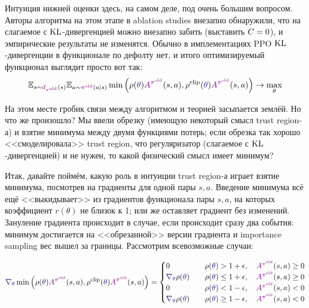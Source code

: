Интуиция нижней оценки здесь, на самом деле, под очень большим вопросом. Авторы алгоритма на этом этапе в ablation studies внезапно обнаружили, что на слагаемое с $\operatorname{KL}$-дивергенцией можно внезапно забить (выставить $C \HM= 0$), и эмпирические результаты не изменятся. Обычно в имплементациях PPO $\operatorname{KL}$-дивергенции в функционале по дефолту нет, и итого оптимизируемый функционал выглядит просто вот так:
\begin{equation}\label{PPOobjective}
\E_{s \sim \textcolor{ChadPurple}{d_{\pi^{\old}}}(s)} \E_{a \sim \textcolor{ChadPurple}{\pi^{\old}}(a \mid s)} \min \left( \rho(\textcolor{ChadBlue}{\theta}) \textcolor{ChadPurple}{A^{\pi^{\old}}}(s, a), \rho^{\clip}(\textcolor{ChadBlue}{\theta}) \textcolor{ChadPurple}{A^{\pi^{\old}}}(s, a)\right) \to \max_\theta
\end{equation}

На этом месте гробик связи между алгоритмом и теорией засыпается землёй. Но что же произошло? Мы ввели обрезку (имеющую некоторый смысл trust region-а) и взятие минимума между двумя функциями потерь; если обрезка так хорошо <<смоделировала>> trust region, что регуляризатор (слагаемое с $\operatorname{KL}$-дивергенцией) и не нужен, то какой физический смысл имеет минимум? 

Итак, давайте поймём, какую роль в интуиции trust region-а играет взятие минимума, посмотрев на градиенты для одной пары $s, a$. Введение минимума всё ещё <<выкидывает>> из градиентов функционала пары $s, a$, на которых коэффициент $r(\theta)$ не близок к 1; или же оставляет градиент без изменений. Зануление градиента происходит в случае, если происходит сразу два события: минимум достигается на <<обрезанной>> версии градиента и importance sampling вес вышел за границы. Рассмотрим всевозможные случаи:

$$\textcolor{ChadBlue}{\nabla_\theta} \min \left( \rho(\textcolor{ChadBlue}{\theta}) \textcolor{ChadPurple}{A^{\pi^{\old}}}(s, a), \rho^{\clip}(\textcolor{ChadBlue}{\theta}) \textcolor{ChadPurple}{A^{\pi^{\old}}}(s, a)\right) = 
\begin{cases}
0 \qquad & \rho(\textcolor{ChadBlue}{\theta}) > 1 + \epsilon, \quad \textcolor{ChadPurple}{A^{\pi^{\old}}}(s, a) \ge 0 \\
\textcolor{ChadBlue}{\nabla_\theta} \rho(\textcolor{ChadBlue}{\theta}) \quad &\rho(\textcolor{ChadBlue}{\theta}) \le 1 + \epsilon, \quad \textcolor{ChadPurple}{A^{\pi^{\old}}}(s, a) \ge 0 \\
0 \qquad & \rho(\textcolor{ChadBlue}{\theta}) < 1 - \epsilon, \quad \textcolor{ChadPurple}{A^{\pi^{\old}}}(s, a) < 0 \\
\textcolor{ChadBlue}{\nabla_\theta} \rho(\textcolor{ChadBlue}{\theta}) \quad &\rho(\textcolor{ChadBlue}{\theta}) \ge 1 - \epsilon, \quad \textcolor{ChadPurple}{A^{\pi^{\old}}}(s, a) < 0 \\
\end{cases}
$$

